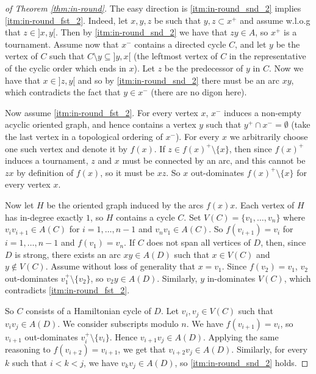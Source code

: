 \begin{proof}[of Theorem \ref{thm:in-round}]
The easy direction is \ref{itm:in-round_snd_2} implies \ref{itm:in-round_fst_2}. Indeed, let $x,y,z$ be such that ${y,z}\subset x^+$ and assume w.l.o.g that $z\in ]x,y[$. Then by \ref{itm:in-round_snd_2} we have that $zy\in A$, so $x^+$ is a tournament. 
Assume now that $x^-$  contains a directed cycle $C$, and let $y$ be the vertex of $C$ such that $C\setminus{y} \subseteq ]y,x[$ (the leftmost vertex of $C$ in the representative of the cyclic order which ends in $x$). Let $z$ be the predecessor of $y$ in $C$. Now we have that $x\in ]z,y[$ and so by \ref{itm:in-round_snd_2} there must be an arc $xy$, which contradicts the fact that $y\in x^-$ (there are no digon here).

Now assume \ref{itm:in-round_fst_2}. For every vertex $x$, $x^-$ induces a non-empty acyclic oriented graph, and hence contains a vertex $y$ such that $y^+\cap x^- = \emptyset$ (take the last vertex in a topological ordering of $x^-$). 
For every $x$ we arbitrarily choose one such vertex and denote it by $f(x)$. If $z \in f(x)^+ \setminus \{x\}$, then since $f(x)^+$ induces a tournament, $z$ and $x$ must be connected by an arc, and this cannot be $zx$ by definition of $f(x)$, so it must be  $xz$. So $x$ out-dominates $f(x)^+ \setminus \{x\}$ for every vertex $x$. 

Now let $H$ be the oriented graph induced by the arcs $f(x)x$. Each vertex of $H$ has in-degree exactly $1$, so $H$ contains a cycle $C$. Set $V(C) = \{v_1, \dots, v_n\}$ where $v_iv_{i+1} \in A(C)$ for $i=1, \dots, n-1$ and $v_nv_1 \in A(C)$. So $f(v_{i+1}) = v_i$ for $i=1, \dots, n-1$ and $f(v_1)=v_n$. 
If $C$ does not span all vertices of $D$, then, since $D$ is strong, there exists an arc $xy \in A(D)$ such that $x\in V(C)$ and $y\not\in V(C)$. Assume without loss of generality that $x=v_1$. Since $f(v_2) = v_1$, $v_2$ out-dominates $v_1^+ \setminus \{v_2\}$, so $v_2y \in A(D)$. Similarly, $y$ in-dominates $V(C)$, which contradicts \ref{itm:in-round_fst_2}. 

So $C$ consists of a Hamiltonian cycle of $D$. Let $v_i,v_j \in V(C)$ such that $v_iv_j \in A(D)$. We consider subscripts modulo $n$.  We have $f(v_{i+1}) = v_i$, so $v_{i+1}$ out-dominates $v_{i}^+ \setminus \{v_i\}$. Hence $v_{i+1}v_j \in A(D)$. Applying the same reasoning to $f(v_{i+2}) = v_{i+1} $, we get that $v_{i+2}v_j \in A(D)$. Similarly, for every $k$ such that $i < k < j$, we have $v_kv_j \in A(D)$, so  \ref{itm:in-round_snd_2} holds.
 
\end{proof}

